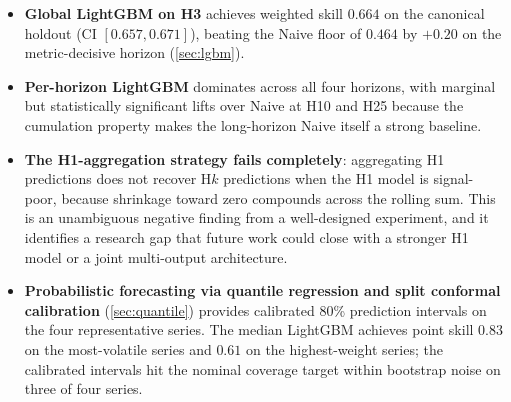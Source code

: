 \begin{itemize}
  \item \textbf{Global LightGBM on H3} achieves weighted skill $0.664$ on the canonical holdout (CI $[0.657, 0.671]$), beating the Naive floor of $0.464$ by $+0.20$ on the metric-decisive horizon (\cref{sec:lgbm}).
  \item \textbf{Per-horizon LightGBM} dominates across all four horizons, with marginal but statistically significant lifts over Naive at H10 and H25 because the cumulation property makes the long-horizon Naive itself a strong baseline.
  \item \textbf{The H1-aggregation strategy fails completely}: aggregating H1 predictions does not recover H$k$ predictions when the H1 model is signal-poor, because shrinkage toward zero compounds across the rolling sum. This is an unambiguous negative finding from a well-designed experiment, and it identifies a research gap that future work could close with a stronger H1 model or a joint multi-output architecture.
  \item \textbf{Probabilistic forecasting via quantile regression and split conformal calibration} (\cref{sec:quantile}) provides calibrated 80\% prediction intervals on the four representative series. The median LightGBM achieves point skill $0.83$ on the most-volatile series and $0.61$ on the highest-weight series; the calibrated intervals hit the nominal coverage target within bootstrap noise on three of four series.
\end{itemize}
